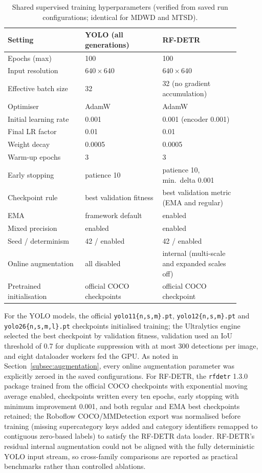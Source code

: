 \begin{table}[htbp]
\centering
\caption{Shared supervised training hyperparameters (verified from saved run configurations; identical for MDWD and MTSD).}
\label{tab:supervised-hparams}
\small
\begin{tabular}{p{0.30\linewidth}p{0.30\linewidth}p{0.30\linewidth}}
\hline
\textbf{Setting} & \textbf{YOLO (all generations)} & \textbf{RF-DETR} \\
\hline
Epochs (max) & 100 & 100 \\
Input resolution & $640 \times 640$ & $640 \times 640$ \\
Effective batch size & 32 & 32 (no gradient accumulation) \\
Optimiser & AdamW & AdamW \\
Initial learning rate & 0.001 & 0.001 (encoder 0.001) \\
Final LR factor & 0.01 & 0.01 \\
Weight decay & 0.0005 & 0.0005 \\
Warm-up epochs & 3 & 3 \\
Early stopping & patience 10 & patience 10, min.\ delta 0.001 \\
Checkpoint rule & best validation fitness & best validation metric (EMA and regular) \\
EMA & framework default & enabled \\
Mixed precision & enabled & enabled \\
Seed / determinism & 42 / enabled & 42 / enabled \\
Online augmentation & all disabled & internal (multi-scale and expanded scales off) \\
Pretrained initialisation & official COCO checkpoints & official COCO checkpoint \\
\hline
\end{tabular}
\end{table}

For the YOLO models, the official \texttt{yolo11\{n,s,m\}.pt}, \texttt{yolo12\{n,s,m\}.pt} and \texttt{yolo26\{n,s,m,l\}.pt} checkpoints initialised training; the Ultralytics engine selected the best checkpoint by validation fitness, validation used an IoU threshold of 0.7 for duplicate suppression with at most 300 detections per image, and eight dataloader workers fed the GPU. As noted in Section~\ref{subsec:augmentation}, every online augmentation parameter was explicitly zeroed in the saved configurations. For RF-DETR, the \texttt{rfdetr} 1.3.0 package trained from the official COCO checkpoints with exponential moving average enabled, checkpoints written every ten epochs, early stopping with minimum improvement 0.001, and both regular and EMA best checkpoints retained; the Roboflow COCO/MMDetection export was normalised before training (missing supercategory keys added and category identifiers remapped to contiguous zero-based labels) to satisfy the RF-DETR data loader. RF-DETR's residual internal augmentation could not be aligned with the fully deterministic YOLO input stream, so cross-family comparisons are reported as practical benchmarks rather than controlled ablations.

